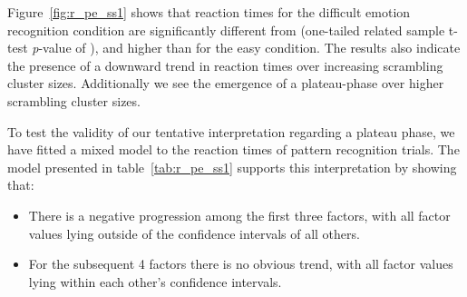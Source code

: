 	    Figure~\ref{fig:r_pe_ss1} shows that reaction times for the difficult emotion recognition condition are significantly different from (one-tailed related sample t-test \textit{p}-value of 
	    ),
	    and higher than for the easy condition.
	    The results also indicate the presence of a downward trend in reaction times over increasing scrambling cluster sizes.
	    Additionally we see the emergence of a plateau-phase over higher scrambling cluster sizes.
	    
	    To test the validity of our tentative interpretation regarding a plateau phase, we have fitted a mixed model to the reaction times of pattern recognition trials.
	    The model presented in table~\ref{tab:r_pe_ss1} supports this interpretation by showing that:
	    \begin{itemize}
		\item There is a negative progression among the first three factors, with all factor values lying outside of the confidence intervals of all others.
		\item For the subsequent 4 factors there is no obvious trend, with all factor values lying within each other's confidence intervals. 
	    \end{itemize}

